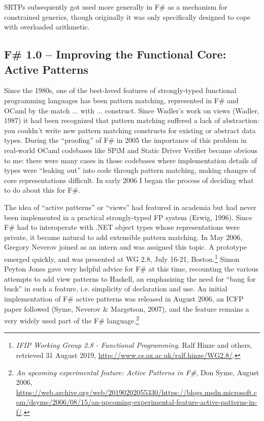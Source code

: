 \documentclass[acmsmall,review]{acmart}\settopmatter{printfolios=true,printccs=false,printacmref=false}
\begin{document}
SRTPs subsequently got used more generally in F\# as a mechanism for constrained generics, though originally it was only specifically designed to cope with overloaded arithmetic.


\subsection*{F\# 1.0 – Improving the Functional Core: Active Patterns}

Since the 1980s, one of the best-loved features of strongly-typed functional programming languages has been pattern matching, represented in F\# and OCaml by the match ... with ... construct. Since Wadler’s work on views (Wadler, 1987) it had been recognized that pattern matching suffered a lack of abstraction: you couldn’t write new pattern matching constructs for existing or abstract data types.  During the “proofing” of F\# in 2005 the importance of this problem in real-world OCaml codebases like SPiM and Static Driver Verifier became obvious to me: there were many cases in those codebases where implementation details of types were “leaking out” into code through pattern matching, making changes of core representations difficult.  In early 2006 I began the process of deciding what to do about this for F\#.  

The idea of “active patterns” or “views” had featured in academia but had never been implemented in a practical strongly-typed FP system (Erwig, 1996).  Since F\# had to interoperate with .NET object types whose representations were private, it became natural to add extensible pattern matching. In May 2006, Gregory Neverov joined as an intern and was assigned this topic.  A prototype emerged quickly, and was presented at WG 2.8, July 16-21, Boston.\footnote{\textit{IFIP Working Group 2.8 - Functional Programming}, Ralf Hinze and others, retrieved 31 August 2019, \url{http://www.cs.ox.ac.uk/ralf.hinze/WG2.8/}.}  Simon Peyton Jones gave very helpful advice for F\# at this time, recounting the various attempts to add view patterns to Haskell, an emphasizing the need for “bang for buck” in such a feature, i.e. simplicity of declaration and use. An initial implementation of F\# active patterns was released in August 2006, an ICFP paper followed (Syme, Neverov \& Margetson, 2007), and the feature remains a very widely used part of the F\# language.\footnote{\textit{An upcoming experimental feature: Active Patterns in F\#}, Don Syme, August 2006, \url{https://web.archive.org/web/20190202055330/https://blogs.msdn.microsoft.com/dsyme/2006/08/15/an-upcoming-experimental-feature-active-patterns-in-f/}.}
\end{document}
